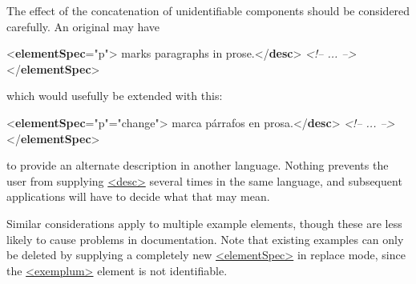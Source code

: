 The effect of the concatenation of unidentifiable components should be considered carefully. An original may have \par\bgroup{}\exampleFont \begin{shaded}\noindent\mbox{}{<\textbf{elementSpec}\hspace*{1em}{ident}="{p}">}\mbox{}\newline 
{}marks paragraphs in prose.{</\textbf{desc}>}\mbox{}\newline 
\textit{<!-- ... -->}\mbox{}\newline 
{</\textbf{elementSpec}>}\end{shaded}\egroup\par \noindent  which would usefully be extended with this: \par\bgroup{}\exampleFont \begin{shaded}\noindent\mbox{}{<\textbf{elementSpec}\hspace*{1em}{ident}="{p}"\hspace*{1em}{mode}="{change}">}\mbox{}\newline 
{}marca párrafos en prosa.{</\textbf{desc}>}\mbox{}\newline 
\textit{<!-- ... -->}\mbox{}\newline 
{</\textbf{elementSpec}>}\end{shaded}\egroup\par \noindent  to provide an alternate description in another language. Nothing prevents the user from supplying \hyperref[TEI.desc]{<desc>} several times in the same language, and subsequent applications will have to decide what that may mean.\par
Similar considerations apply to multiple example elements, though these are less likely to cause problems in documentation. Note that existing examples can only be deleted by supplying a completely new \hyperref[TEI.elementSpec]{<elementSpec>} in replace mode, since the \hyperref[TEI.exemplum]{<exemplum>} element is not identifiable.\par
